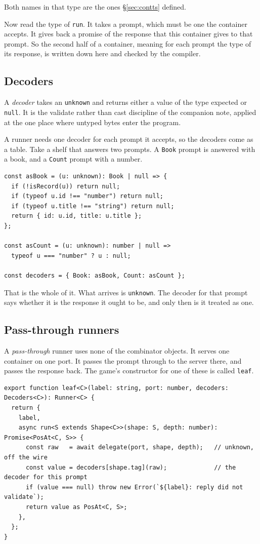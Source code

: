 \documentclass[11pt,a4paper]{article}
\begin{document}
Both names in that type are the ones \S\ref{sec:contts} defined.

Now read the type of \texttt{run}. It takes a prompt, which must be one the container accepts. It
gives back a promise of the response that this container gives to that prompt. So the second half of
a container, meaning for each prompt the type of its response, is written down here and checked by the
compiler.

\subsection{Decoders}
\label{sec:decoders}

A \emph{decoder} takes an \texttt{unknown} and returns either a value of the type expected or
\texttt{null}. It is the validate rather than cast discipline of the companion note, applied at
the one place where untyped bytes enter the program.

A runner needs one decoder for each prompt it accepts, so the decoders come as a table. Take a shelf
that answers two prompts. A \texttt{Book} prompt is answered with a book, and a \texttt{Count}
prompt with a number.

\begin{lstlisting}[language=TS]
const asBook = (u: unknown): Book | null => {
  if (!isRecord(u)) return null;
  if (typeof u.id !== "number") return null;
  if (typeof u.title !== "string") return null;
  return { id: u.id, title: u.title };
};

const asCount = (u: unknown): number | null =>
  typeof u === "number" ? u : null;

const decoders = { Book: asBook, Count: asCount };
\end{lstlisting}

That is the whole of it. What arrives is \texttt{unknown}. The decoder for that prompt says whether
it is the response it ought to be, and only then is it treated as one.

\subsection{Pass-through runners}

A \emph{pass-through} runner uses none of the combinator objects. It serves one container on one
port. It passes the prompt through to the server there, and passes the response back. The game's
constructor for one of these is called \texttt{leaf}.

\begin{lstlisting}[language=TS]
export function leaf<C>(label: string, port: number, decoders: Decoders<C>): Runner<C> {
  return {
    label,
    async run<S extends Shape<C>>(shape: S, depth: number): Promise<PosAt<C, S>> {
      const raw   = await delegate(port, shape, depth);   // unknown, off the wire
      const value = decoders[shape.tag](raw);             // the decoder for this prompt
      if (value === null) throw new Error(`${label}: reply did not validate`);
      return value as PosAt<C, S>;
    },
  };
}
\end{lstlisting}
\end{document}

